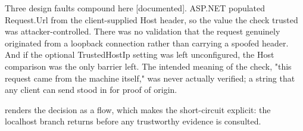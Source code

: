 \documentclass[11pt,a4paper]{article}
\newcommand{\code}[1]{{\small\ttfamily #1}}
\newcommand{\tier}[1]{{\small\color{meta}\textsf{[#1]}}}
\begin{document}
Three design faults compound here \tier{documented}. ASP.NET populated \code{Request.Url} from the client-supplied \code{Host} header, so the value the check trusted was attacker-controlled. There was no validation that the request genuinely originated from a loopback connection rather than carrying a spoofed header. And if the optional \code{TrustedHostIp} setting was left unconfigured, the \code{Host} comparison was the only barrier left. The intended meaning of the check, "this request came from the machine itself," was never actually verified; a string that any client can send stood in for proof of origin.

 renders the decision as a flow, which makes the short-circuit explicit: the \code{localhost} branch returns before any trustworthy evidence is consulted.
\end{document}
